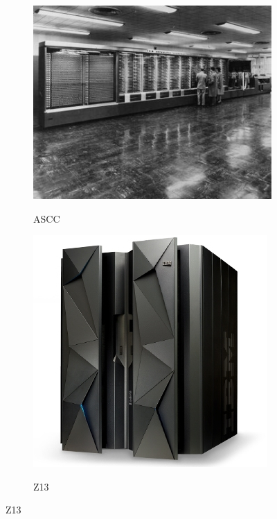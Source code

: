\documentclass[paper=a4, fontsize=10pt]{scrartcl} %
\numberwithin{equation}{section} %
\numberwithin{figure}{section} %
\numberwithin{table}{section} %
\begin{document}
\begin{figure}[H]
	\centering
	\begin{subfigure}{.5\textwidth}
		\centering
		\href{https://www-03.ibm.com/ibm/history/exhibits/markI/markI_intro.html}{		\includegraphics[width=.75\linewidth]{./Imagenes/ascc.jpg}}
		\caption{ASCC}
		\label{fig:ascc}
	\end{subfigure}%
	\begin{subfigure}{.5\textwidth}
		\centering
		\href{https://www-03.ibm.com/systems/z/hardware/z13.html}{\includegraphics[width=.75\linewidth]{./Imagenes/z13.jpg}}
		\caption{Z13}
		\label{fig:z13}
	\end{subfigure}
\end{figure}
\end{document}
